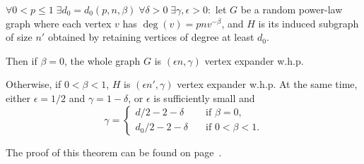 \begin{theorem}
    \label{thm:powerlaw-permutation-vertex-expansion}
    $\forall 0<p\leq 1\;\exists d_0=d_0(p,n,\beta)\;\forall\delta>0\;\exists\gamma,\epsilon>0:$
    let $G$ be a random power-law graph where each vertex $v$ has $\deg(v)=pnv^{-\beta}$,
    and $H$ is its induced subgraph of size $n'$ obtained by retaining vertices of degree at least $d_0$.
    
    Then if $\beta=0$, the whole graph $G$ is $(\epsilon n,\gamma)$ vertex expander w.h.p.
    
    Otherwise, if $0<\beta<1$, $H$ is $(\epsilon n',\gamma)$ vertex expander w.h.p.
    At the same time, either $\epsilon=1/2$ and $\gamma=1-\delta$,
    or $\epsilon$ is sufficiently small and
    \begin{equation}
        \gamma=\begin{cases}
            d/2-2-\delta & \quad \text{if } \beta=0,\\
            d_0/2-2-\delta & \quad \text{if } 0<\beta<1.
        \end{cases}
    \end{equation}
\end{theorem}

The proof of this theorem can be found on page~\pageref*{prf:powerlaw-permutation-vertex-expansion}.

